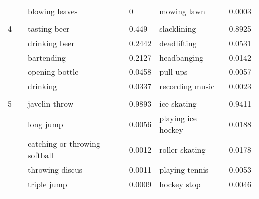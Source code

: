 \begin{tabular}{llllll}
  & {} &                    blowing leaves &       0 &                mowing lawn &  0.0003 \\
  & {} &                                   &         &                            &         \\
4 & {} &                      tasting beer &   0.449 &                slacklining &  0.8925 \\
  & {} &                     drinking beer &  0.2442 &                deadlifting &  0.0531 \\
  & {} &                        bartending &  0.2127 &                headbanging &  0.0142 \\
  & {} &                    opening bottle &  0.0458 &                   pull ups &  0.0057 \\
  & {} &                          drinking &  0.0337 &            recording music &  0.0023 \\
  & {} &                                   &         &                            &         \\
5 & {} &                     javelin throw &  0.9893 &                ice skating &  0.9411 \\
  & {} &                         long jump &  0.0056 &         playing ice hockey &  0.0188 \\
  & {} &     catching or throwing softball &  0.0012 &             roller skating &  0.0178 \\
  & {} &                   throwing discus &  0.0011 &             playing tennis &  0.0053 \\
  & {} &                       triple jump &  0.0009 &                hockey stop &  0.0046 \\
  & {} &                                   &         &                            &         \\
\bottomrule
\end{tabular}
